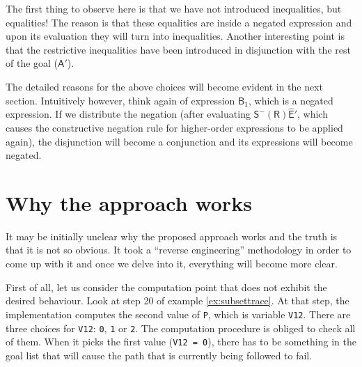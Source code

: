 \documentclass[inscr,ack,preface]{dithesis}
\theoremstyle{definition}
\newcommand{\msf}[1]{$\mathsf{#1}$}
\begin{document}
The first thing to observe here is that we have not introduced inequalities, but equalities! The reason is that these equalities are inside a negated expression and upon its evaluation they will turn into inequalities. Another interesting point is that the restrictive inequalities have been introduced in disjunction with the rest of the goal (\msf{A'}).

The detailed reasons for the above choices will become evident in the next section. Intuitively however, think again of expression \msf{B_1}, which is a negated expression. If we distribute the negation (after evaluating \msf{S^{-} \left( R \right) \widehat{E}'}, which causes the constructive negation rule for higher-order expressions to be applied again), the disjunction will become a conjunction and its expressions will become negated.


\section{Why the approach works}
It may be initially unclear why the proposed approach works and the truth is that it is not so obvious. It took a ``reverse engineering'' methodology in order to come up with it and once we delve into it, everything will become more clear.

First of all, let us consider the computation point that does not exhibit the desired behaviour. Look at step 20 of example \ref{ex:subsettrace}. At that step, the implementation computes the second value of \texttt{P}, which is variable \texttt{V12}. There are three choices for \texttt{V12}: \texttt{0}, \texttt{1} or \texttt{2}. The computation procedure is obliged to check all of them. When it picks the first value (\texttt{V12 = 0}), there has to be something in the goal list that will cause the path that is currently being followed to fail.
\end{document}
